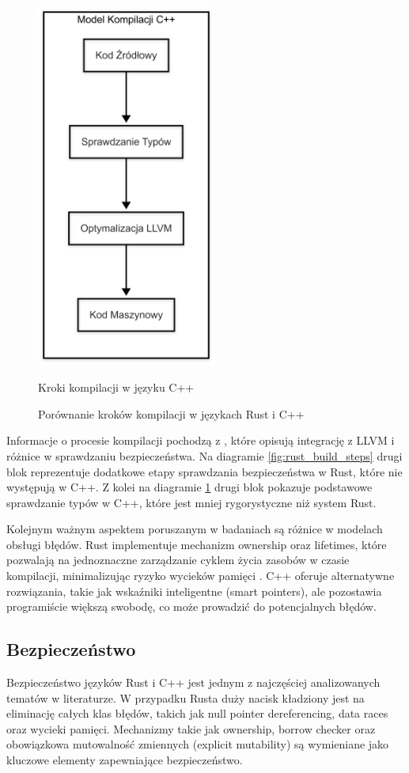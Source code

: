 \begin{figure}[H]
\begin{minipage}{.5\textwidth}
        \includegraphics[height=12cm]{images/CppBuildsSteps.png}
        \caption{Kroki kompilacji w języku C++}
        \label{fig:cpp_build_steps}
    \end{minipage}
    \caption{Porównanie kroków kompilacji w językach Rust i C++}
\end{figure}

Informacje o procesie kompilacji pochodzą z \cite{Lesiński, rustPolishNames, TheRustProgrammingLanguage}, które opisują integrację z LLVM i różnice w sprawdzaniu bezpieczeństwa.
Na diagramie \ref{fig:rust_build_steps} drugi blok reprezentuje dodatkowe etapy sprawdzania bezpieczeństwa w Rust, które nie występują w C++. Z kolei na diagramie \ref{fig:cpp_build_steps} drugi blok pokazuje podstawowe sprawdzanie typów w C++, które jest mniej rygorystyczne niż system Rust.

Kolejnym ważnym aspektem poruszanym w badaniach są różnice w modelach obsługi błędów. Rust implementuje mechanizm ownership oraz lifetimes, które pozwalają na jednoznaczne zarządzanie cyklem życia zasobów w czasie kompilacji, minimalizując ryzyko wycieków pamięci \cite{MigratingCtoRustforMemorySafety}. C++ oferuje alternatywne rozwiązania, takie jak wskaźniki inteligentne (smart pointers), ale pozostawia programiście większą swobodę, co może prowadzić do potencjalnych błędów. \cite{RustDifferences, RustDifferences1}

\subsection{Bezpieczeństwo}
Bezpieczeństwo języków Rust i C++ jest jednym z najczęściej analizowanych tematów w literaturze. W przypadku Rusta duży nacisk kładziony jest na eliminację całych klas błędów, takich jak null pointer dereferencing, data races oraz wycieki pamięci. Mechanizmy takie jak ownership, borrow checker oraz obowiązkowa mutowalność zmiennych (explicit mutability) są wymieniane jako kluczowe elementy zapewniające bezpieczeństwo.


